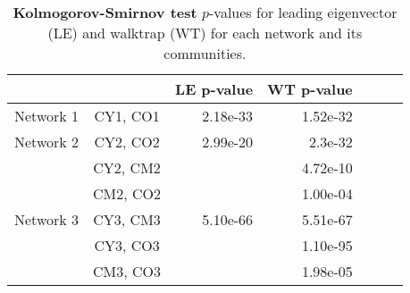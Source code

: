 \begin{table}
\centering
\caption[Kolmogorov-Smirnov test]{\textbf{Kolmogorov-Smirnov test} $p$-values for leading eigenvector (LE) and walktrap (WT) for each network and its communities.}
\label{tab:pvalues2}
\vspace*{5mm}
\begin{tabular}{lcrrrrr}
	\toprule

	\rowcolor{Gray}
	 & & LE p-value & WT p-value\\
	\midrule 
	\quad Network 1     & CY1, CO1 & 2.18e-33 & 1.52e-32 \\
	\midrule   							
	\quad Network 2     & CY2, CO2 & 2.99e-20 & 2.3e-32 \\
					    & CY2, CM2 &          & 4.72e-10\\
					    & CM2, CO2 &          & 1.00e-04\\
	\midrule  
	\quad Network 3     & CY3, CM3 & 5.10e-66 & 5.51e-67\\
					    & CY3, CO3 &          & 1.10e-95\\
						& CM3, CO3 &          & 1.98e-05\\ 
	\bottomrule
\end{tabular}
\end{table}